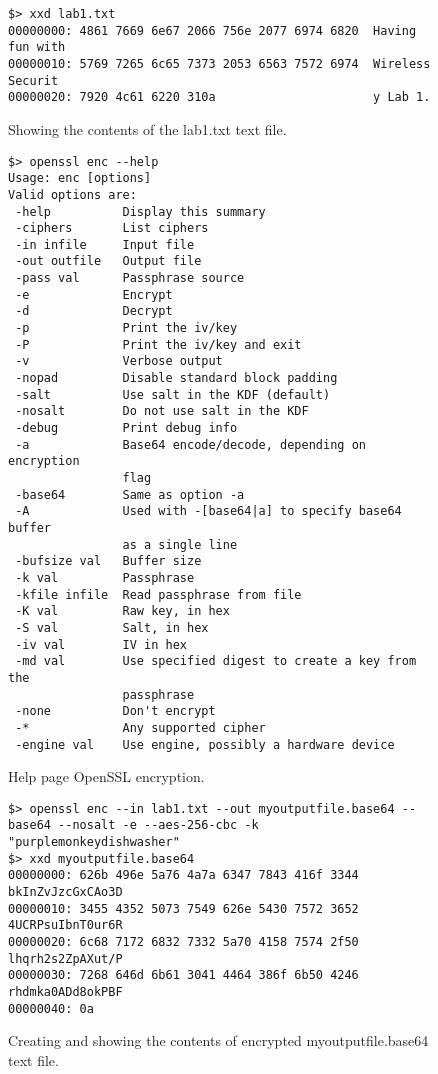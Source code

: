 \documentclass{article}
\begin{document}
\begin{figure}
\begin{mdframed}
\begin{lstlisting}
$> xxd lab1.txt
00000000: 4861 7669 6e67 2066 756e 2077 6974 6820  Having fun with 
00000010: 5769 7265 6c65 7373 2053 6563 7572 6974  Wireless Securit
00000020: 7920 4c61 6220 310a                      y Lab 1.
\end{lstlisting}
\end{mdframed}
\caption{Showing the contents of the lab1.txt text file.}
\label{fig:step1b}
\end{figure}

\begin{figure}
\begin{mdframed}
\begin{lstlisting}
$> openssl enc --help
Usage: enc [options]
Valid options are:
 -help          Display this summary
 -ciphers       List ciphers
 -in infile     Input file
 -out outfile   Output file
 -pass val      Passphrase source
 -e             Encrypt
 -d             Decrypt
 -p             Print the iv/key
 -P             Print the iv/key and exit
 -v             Verbose output
 -nopad         Disable standard block padding
 -salt          Use salt in the KDF (default)
 -nosalt        Do not use salt in the KDF
 -debug         Print debug info
 -a             Base64 encode/decode, depending on encryption
                flag
 -base64        Same as option -a
 -A             Used with -[base64|a] to specify base64 buffer
                as a single line
 -bufsize val   Buffer size
 -k val         Passphrase
 -kfile infile  Read passphrase from file
 -K val         Raw key, in hex
 -S val         Salt, in hex
 -iv val        IV in hex
 -md val        Use specified digest to create a key from the
                passphrase
 -none          Don't encrypt
 -*             Any supported cipher
 -engine val    Use engine, possibly a hardware device
\end{lstlisting}
\end{mdframed}
\caption{Help page OpenSSL encryption.}
\label{fig:step1c}
\end{figure}

\begin{figure}
\begin{mdframed}
\begin{lstlisting}
$> openssl enc --in lab1.txt --out myoutputfile.base64 --base64 --nosalt -e --aes-256-cbc -k "purplemonkeydishwasher"
$> xxd myoutputfile.base64
00000000: 626b 496e 5a76 4a7a 6347 7843 416f 3344  bkInZvJzcGxCAo3D
00000010: 3455 4352 5073 7549 626e 5430 7572 3652  4UCRPsuIbnT0ur6R
00000020: 6c68 7172 6832 7332 5a70 4158 7574 2f50  lhqrh2s2ZpAXut/P
00000030: 7268 646d 6b61 3041 4464 386f 6b50 4246  rhdmka0ADd8okPBF
00000040: 0a
\end{lstlisting}
\end{mdframed}
\caption{Creating and showing the contents of encrypted myoutputfile.base64 text file.}
\label{fig:step1d}
\end{figure}
\end{document}
